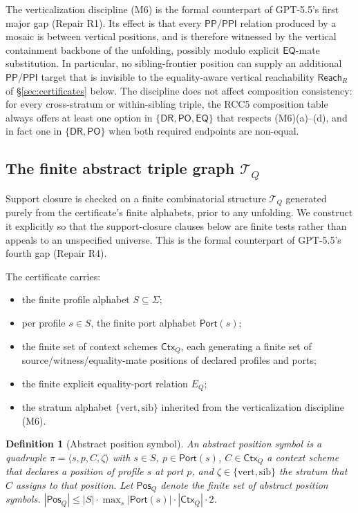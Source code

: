 \documentclass[11pt]{article}
\newtheorem{definition}[theorem]{Definition}
\newcommand{\EQ}{\mathsf{EQ}}
\newcommand{\DR}{\mathsf{DR}}
\newcommand{\PO}{\mathsf{PO}}
\newcommand{\PP}{\mathsf{PP}}
\newcommand{\PPI}{\mathsf{PPI}}
\newcommand{\Ctx}{\mathsf{Ctx}}
\newcommand{\Port}{\mathsf{Port}}
\newcommand{\Reach}{\mathrel{\mathsf{Reach}}}
\newcommand{\vertical}{\mathrm{vert}}
\newcommand{\sibling}{\mathrm{sib}}
\newcommand{\Pos}{\mathsf{Pos}}
\begin{document}
The verticalization discipline (M6) is the formal counterpart of GPT-5.5's first major gap (Repair R1).  Its effect is that every $\PP/\PPI$ relation produced by a mosaic is between vertical positions, and is therefore witnessed by the vertical containment backbone of the unfolding, possibly modulo explicit $\EQ$-mate substitution.  In particular, no sibling-frontier position can supply an additional $\PP/\PPI$ target that is invisible to the equality-aware vertical reachability $\Reach_R$ of \S\ref{sec:certificates} below.  The discipline does not affect composition consistency: for every cross-stratum or within-sibling triple, the RCC5 composition table always offers at least one option in $\{\DR,\PO,\EQ\}$ that respects (M6)(a)--(d), and in fact one in $\{\DR,\PO\}$ when both required endpoints are non-equal.

\subsection{The finite abstract triple graph $\mathcal T_Q$}
\label{ssec:abstract-triples}

Support closure is checked on a finite combinatorial structure
$\mathcal T_Q$ generated purely from the certificate's finite
alphabets, prior to any unfolding.  We construct it explicitly so
that the support-closure clauses below are finite tests rather than
appeals to an unspecified universe.  This is the formal counterpart
of GPT-5.5's fourth gap (Repair R4).

The certificate carries:
\begin{itemize}
\item the finite profile alphabet $S\subseteq\Sigma$;
\item per profile $s\in S$, the finite port alphabet $\Port(s)$;
\item the finite set of context schemes $\Ctx_Q$, each generating a
finite set of source/witness/equality-mate positions of declared
profiles and ports;
\item the finite explicit equality-port relation $E_Q$;
\item the stratum alphabet $\{\vertical,\sibling\}$ inherited from
the verticalization discipline (M6).
\end{itemize}

\begin{definition}[Abstract position symbol]\label{def:abs-pos}
An abstract position symbol is a quadruple
$\pi=\langle s,p,C,\zeta\rangle$ with $s\in S$, $p\in\Port(s)$,
$C\in\Ctx_Q$ a context scheme that declares a position of profile
$s$ at port $p$, and $\zeta\in\{\vertical,\sibling\}$ the stratum
that $C$ assigns to that position.  Let $\Pos_Q$ denote the finite
set of abstract position symbols.  $|\Pos_Q|\le|S|\cdot
\max_s|\Port(s)|\cdot|\Ctx_Q|\cdot 2$.
\end{definition}
\end{document}
